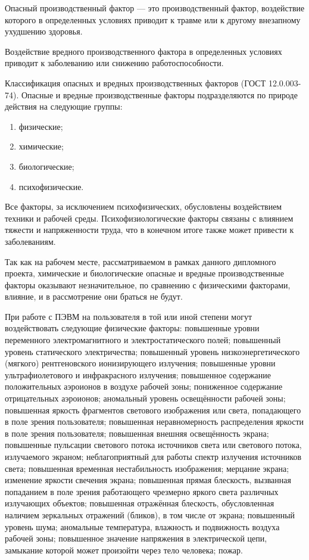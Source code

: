 Опасный производственный фактор --- это производственный фактор, воздействие которого в определенных условиях приводит к травме или к другому внезапному ухудшению здоровья. 

Воздействие вредного производственного фактора в определенных условиях приводит к заболеванию или снижению работоспособности.

Классификация опасных и вредных производственных факторов (ГОСТ 12.0.003-74).
Опасные и вредные производственные факторы подразделяются по природе действия на следующие группы:

\begin{enumerate}
	\item физические;
	\item химические;
	\item биологические;
	\item психофизические.
\end{enumerate}

Все факторы, за исключением психофизических, обусловлены воздействием техники и рабочей среды.
Психофизиологические факторы связаны с влиянием тяжести и напряженности труда, что в конечном итоге также может привести к заболеваниям.

Так как на рабочем месте, рассматриваемом в рамках данного дипломного проекта, химические и биологические опасные и вредные производственные факторы оказывают незначительное, по сравнению с  физическими факторами, влияние, и в рассмотрение они браться не будут.

При работе с ПЭВМ на пользователя в той или иной степени могут воздействовать следующие физические факторы: повышенные уровни переменного электромагнитного и электростатического полей; повышенный уровень статического электричества; повышенный уровень низкоэнергетического (мягкого) рентгеновского ионизирующего излучения; повышенные уровни ультрафиолетового и инфракрасного излучения; повышенное содержание положительных аэроионов в воздухе рабочей зоны; пониженное содержание отрицательных аэроионов; аномальный уровень освещённости рабочей зоны; повышенная яркость фрагментов светового изображения или света, попадающего в поле зрения пользователя; повышенная неравномерность распределения яркости в поле зрения пользователя; повышенная внешняя освещённость экрана; повышенные пульсации светового потока источников света или светового потока, излучаемого экраном; неблагоприятный для работы спектр излучения источников света; повышенная временная нестабильность изображения; мерцание экрана; изменение яркости свечения экрана; повышенная прямая блескость, вызванная попаданием в поле зрения работающего чрезмерно яркого света различных излучающих объектов; повышенная отражённая блескость, обусловленная наличием зеркальных отражений (бликов), в том числе от экрана; повышенный уровень шума; аномальные температура, влажность и подвижность воздуха рабочей зоны; повышенное значение напряжения в электрической цепи, замыкание которой может произойти через тело человека; пожар.

